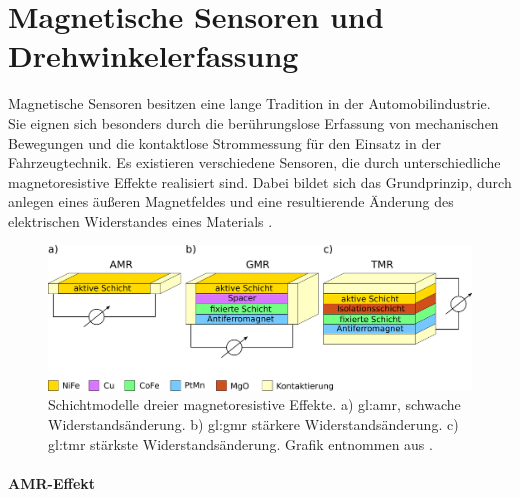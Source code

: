 %

\section{Magnetische Sensoren und Drehwinkelerfassung}\label{sec:magnetische-sensoren}


Magnetische Sensoren besitzen eine lange Tradition in der Automobilindustrie. Sie eignen sich besonders durch die berührungslose Erfassung von mechanischen Bewegungen und die kontaktlose Strommessung für den Einsatz in der Fahrzeugtechnik. Es existieren verschiedene Sensoren, die durch unterschiedliche magnetoresistive Effekte realisiert sind. Dabei bildet sich das Grundprinzip, durch anlegen eines äußeren Magnetfeldes und eine resultierende Änderung des elektrischen Widerstandes eines Materials \cite{Tille2020}.


\vspace{5mm}
\begin{figure}[tbph]
	\centering
	\includegraphics[width=\linewidth]{chapters/images/2-Grundlagen/MR_Schichtmodelle}
	\caption[Schichtmodelle dreier magnetoresistive Effekte]{Schichtmodelle dreier magnetoresistive Effekte. a) 
		\gls{gl:amr}, schwache Widerstandsänderung. b) \gls{gl:gmr} stärkere Widerstandsänderung. c) \gls{gl:tmr} stärkste 
		Widerstandsänderung. Grafik entnommen aus \cite{Lemme2016}.}
	\label{fig:mrschichtmodelle}
\end{figure}


\clearpage


\paragraph{AMR-Effekt}\label{par:AMR}$~$\\


